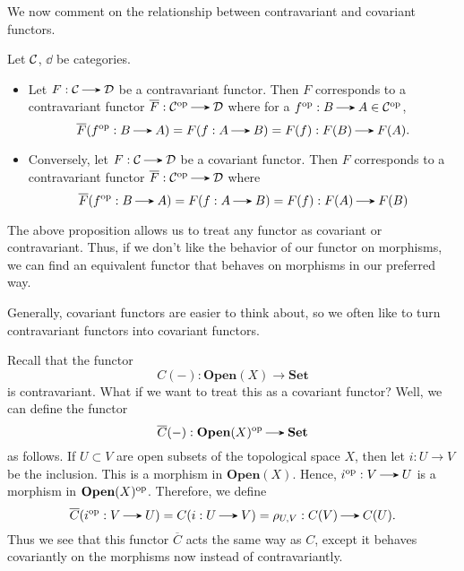     We now comment on the relationship between contravariant and covariant functors. 

    \begin{proposition}
        Let $\mathcal{C}$, $\dd$ be categories. 
        \begin{itemize}
            \item Let $F: \cc \to \dd$ be a contravariant functor. Then $F$ corresponds to a 
            contravariant functor $\overline{F}: \cc\op \to \dd$ where for a $f\op : B \to A \in \cc\op$, 
            \[
                \overline{F}(f\op : B \to A) = F(f: A \to B) = F(f): F(B) \to F(A).
            \] 
            \item Conversely, let $F: \cc \to \dd$ be a covariant functor. Then $F$ 
            corresponds to a contravariant functor $\overline{F}: \cc\op \to \dd$ 
            where 
            \[
                \overline{F}(f\op : B \to A) = F(f: A \to B) = F(f): F(A) \to F(B)
            \]
        \end{itemize}
    \end{proposition}

    The above proposition allows us to treat any functor as covariant or 
    contravariant. Thus, if we don't like the behavior of our functor on morphisms, we can 
    find an equivalent functor that behaves on morphisms in our preferred way. 

    Generally, covariant functors are easier to think about, so we often like 
    to turn contravariant functors into covariant functors. 

    \begin{example}
        Recall that the functor 
        \[
            C(-): \textbf{Open}(X) \to \textbf{Set}
        \]
        is contravariant. What if we want to treat this as a covariant functor? 
        Well, we can define the functor 
        \[
            \overline{C}(-): \textbf{Open}(X)\op \to \textbf{Set}            
        \]
        as follows. If $U \subset V$ are open subsets of the topological space $X$, 
        then let $i: U \to V$ be the inclusion. This is a morphism in $\textbf{Open}(X)$.
        Hence, $i\op: V \to U$ is a morphism in $\textbf{Open}(X)^{\mathrm{op}}$. 
        Therefore, we define
        \[
            \overline{C}(i\op: V \to U) = C(i: U \to V) = \rho_{U,V}: C(V) \to C(U).
        \]
        Thus we see that this functor $\overline{C}$ acts the same way as $C$, except 
        it behaves covariantly on the morphisms now instead of contravariantly. 
    \end{example}

